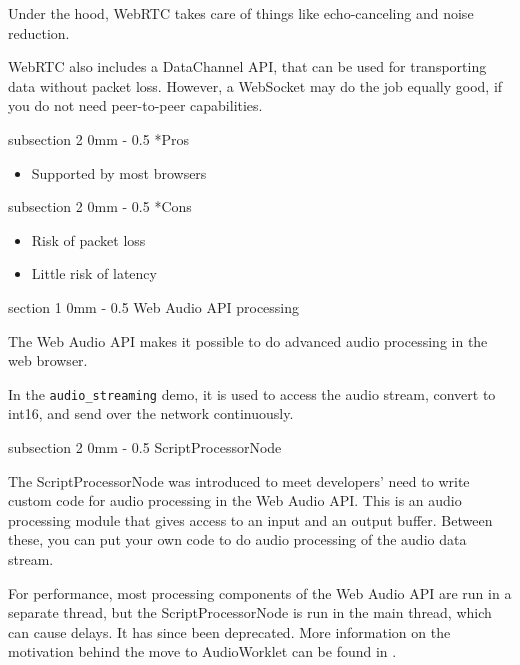 \documentclass[11pt, a4paper, twoside]{article}
\makeatletter
\renewcommand{\subsection}{\@startsection
  {subsection}%
  {2}%
  {0mm}%
  {-\baselineskip}%
  {0.5\baselineskip}%
  {\bfseries\sffamily\large}}%
\renewcommand{\section}{\@startsection
  {section}%
  {1}%
  {0mm}%
  {-\baselineskip}%
  {0.5\baselineskip}%
  {\bfseries\sffamily\Large}}%
\makeatother
\begin{document}
Under the hood, WebRTC takes care of things like echo-canceling and
noise reduction. 


WebRTC also includes a DataChannel API, that can be used for
transporting data without packet loss. However, a WebSocket may do the
job equally good, if you do not need peer-to-peer capabilities.

\subsection*{Pros}
\begin{itemize}
\item Supported by most browsers \cite{webrtcsupport}
\end{itemize}

\subsection*{Cons}
\begin{itemize}
\item Risk of packet loss
\item Little risk of latency
\end{itemize}


\section{Web Audio API processing}

The Web Audio API makes it possible to do advanced audio processing in the web browser.

In the {\tt audio\_streaming} demo, it is used to access the audio stream, convert to int16, and send over the network continuously.

\subsection{ScriptProcessorNode}

The ScriptProcessorNode\cite{scriptprocessornode} was introduced to
meet developers' need to write custom code for audio processing in the
Web Audio API. This is an audio processing module that gives access to
an input and an output buffer. Between these, you can put your own code
to do audio processing of the audio data stream.

For performance, most processing components of the Web
Audio API are run in a separate thread, but the ScriptProcessorNode is
run in the main thread, which can cause delays. It has since been
deprecated. More information on the motivation behind the move to
AudioWorklet can be found in \cite{icmc}.
\end{document}
